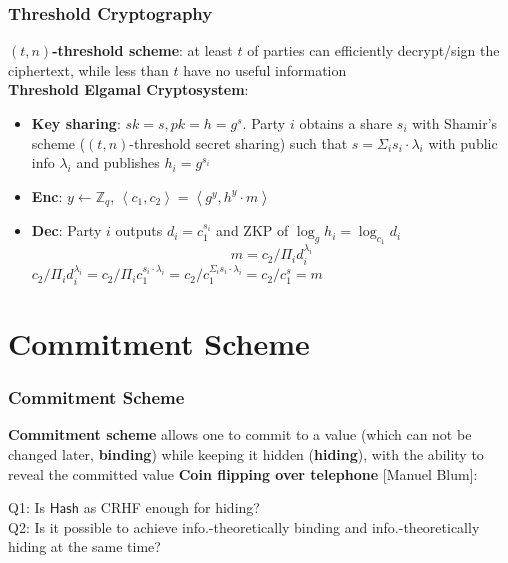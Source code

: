 \begin{frame}\frametitle{Threshold Cryptography}
\textbf{$(t,n)$-threshold scheme}: at least $t$ of parties can efficiently decrypt/sign the ciphertext, while less than $t$ have no useful information\\

\textbf{Threshold Elgamal Cryptosystem}:
\begin{itemize}
\item \textbf{Key sharing}: $sk = s, pk=h=g^s$. Party $i$ obtains a share $s_i$ with Shamir's scheme  ($(t, n)$-threshold secret sharing) such that $s = \Sigma_i s_i\cdot \lambda_i$ with public info $\lambda_i$ and publishes $h_i = g^{s_i}$
\item \textbf{Enc}: $y \gets \mathbb{Z}_q$, $\left<c_1,c_2\right>=\left<g^y,h^y\cdot m\right>$
\item \textbf{Dec}: Party $i$ outputs $d_i = c_1^{s_i}$ and ZKP of $\log_gh_i = \log_{c_1} d_i$
\[ m = c_2/\Pi_i d_i^{\lambda_i} \]
$c_2/\Pi_i d_i^{\lambda_i} = c_2/\Pi_i c_1^{s_i\cdot \lambda_i} = c_2/c_1^{\Sigma_i s_i\cdot \lambda_i} = c_2/c_1^s=m$
\end{itemize}
\end{frame}
\section{Commitment Scheme}
\begin{frame}\frametitle{Commitment Scheme}
\textbf{Commitment scheme} allows one to commit to a value (which can not be changed later, \textbf{binding}) while keeping it hidden (\textbf{hiding}), with the ability to reveal the committed value
\newline
\textbf{Coin flipping over telephone} [Manuel Blum]:
\begin{figure}
\begin{center}

\end{center}
\end{figure}
\alert{Q1: Is $\mathsf{Hash}$ as CRHF enough for hiding? \\
Q2: Is it possible to achieve info.-theoretically binding and info.-theoretically hiding  at the same time?}
\end{frame}
